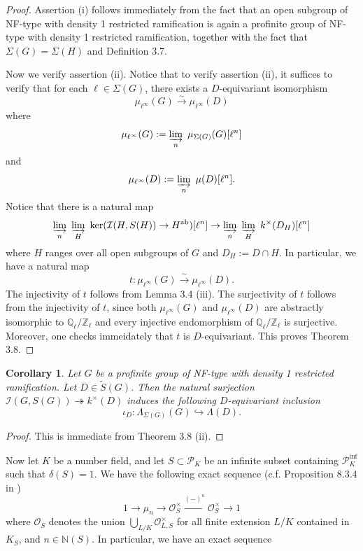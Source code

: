 \documentclass{article}
\theoremstyle{plain}
\newtheorem{cor}[thm]{Corollary}
\theoremstyle{definition}
\theoremstyle{remark}
\begin{document}
\begin{proof}
Assertion (i) follows immediately from the fact that an open subgroup of NF-type with density 1 restricted ramification is again a profinite group of NF-type with density 1 restricted ramification, together with the fact that $\Sigma(G) = \Sigma(H)$ and Definition 3.7. \par 
Now we verify assertion (ii). Notice that to verify assertion (ii), it suffices to verify that for each $\ell \in \Sigma(G)$, there exists a $D$-equivariant isomorphism
$$
\mu_{\ell^{\infty}}(G) \xrightarrow{\sim} \mu_{\ell^{\infty}}(D)
$$
where
$$
\mu_{\ell^{\infty}}(G) := \varinjlim_n ~\mu_{\Sigma(G)}(G)[\ell^n]
$$
and
$$
\mu_{\ell^{\infty}}(D) := \varinjlim_n ~\mu(D)[\ell^n].
$$
Notice that there is a natural map
$$
\varinjlim_n ~\varinjlim_H ~\text{ker}(\mathcal{I}(H,S(H)) \to H^{\text{ab}})[\ell^n] \to \varinjlim_n ~\varinjlim_H~k^{\times}(D_H)[\ell^{n}]
$$
where $H$ ranges over all open subgroups of $G$ and $D_H := D \cap H$. In particular, we have a natural map
$$
t: \mu_{\ell^{\infty}}(G) \xrightarrow{\sim} \mu_{\ell^{\infty}}(D).
$$
The injectivity of $t$ follows from Lemma 3.4 (iii). The surjectivity of $t$ follows from the injectivity of $t$, since both $\mu_{\ell^{\infty}}(G)$ and $\mu_{\ell^{\infty}}(D)$ are abstractly isomorphic to $\mathbb{Q}_{\ell}/\mathbb{Z}_{\ell}$ and every injective endomorphism of $\mathbb{Q}_{\ell}/\mathbb{Z}_{\ell}$ is surjective. Moreover, one checks immeidately that $t$ is $D$-equivariant. This proves Theorem 3.8.
\end{proof}
\begin{cor}
Let $G$ be a profinite group of NF-type with density 1 restricted ramification. Let $D \in \widetilde{S}(G)$. Then the natural surjection $\mathcal{I}(G,S(G)) \twoheadrightarrow k^{\times}(D)$ induces the following $D$-equivariant inclusion
$$
\iota_D: \Lambda_{\Sigma(G)}(G) \hookrightarrow \Lambda(D).
$$
\end{cor}
\begin{proof}
This is immediate from Theorem 3.8 (ii).
\end{proof}
Now let $K$ be a number field, and let $S \subset \mathscr{P}_K$ be an infinite subset containing $\mathscr{P}_K^{\text{inf}}$ such that $\delta(S) = 1$. We have the following exact sequence (c.f. Proposition 8.3.4 in \cite{NSW})
$$
1 \to \mu_n \to \mathcal{O}_S^{\times} \xrightarrow{(-)^n} \mathcal{O}_S^{\times} \to 1
$$
where $\mathcal{O}_S$ denotes the union $\bigcup_{L/K} \mathcal{O}^{\times}_{L,S}$ for all finite extension $L/K$ contained in $K_S$, and $n \in \mathbb{N}(S)$. In particular, we have an exact sequence
\end{document}
